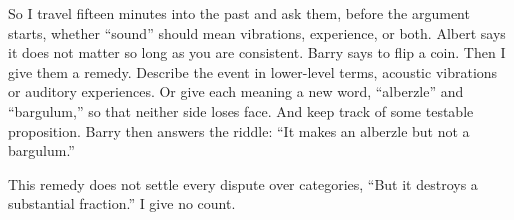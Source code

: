 So I travel fifteen minutes into the past and ask them, before the argument starts, whether ``sound'' should mean vibrations, experience, or both. Albert says it does not matter so long as you are consistent. Barry says to flip a coin. Then I give them a remedy. Describe the event in lower-level terms, acoustic vibrations or auditory experiences. Or give each meaning a new word, ``alberzle'' and ``bargulum,'' so that neither side loses face. And keep track of some testable proposition. Barry then answers the riddle: ``It makes an alberzle but not a bargulum.'' 

This remedy does not settle every dispute over categories, ``But it destroys a substantial fraction.'' I give no count. 
